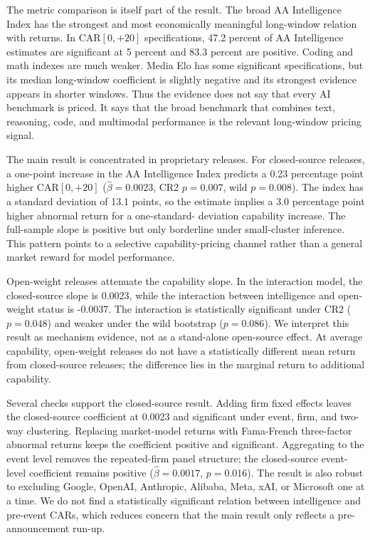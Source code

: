\documentclass[12pt]{article}
\begin{document}
The metric comparison is itself part of the result. The broad AA Intelligence
Index has the strongest and most economically meaningful long-window relation
with returns. In CAR$[0,{+}20]$ specifications, 47.2 percent of AA Intelligence
estimates are significant at 5 percent and 83.3 percent are positive. Coding and
math indexes are much weaker. Media Elo has some significant specifications, but
its median long-window coefficient is slightly negative and its strongest
evidence appears in shorter windows. Thus the evidence does not say that every
AI benchmark is priced. It says that the broad benchmark that combines text,
reasoning, code, and multimodal performance is the relevant long-window pricing
signal.

The main result is concentrated in proprietary releases. For closed-source
releases, a one-point increase in the AA Intelligence Index predicts a 0.23
percentage point higher CAR$[0,{+}20]$ ($\hat{\beta}=0.0023$, CR2 $p=0.007$,
wild $p=0.008$). The index has a standard deviation of 13.1 points, so the
estimate implies a 3.0 percentage point higher abnormal return for a one-standard-
deviation capability increase. The full-sample slope is positive but only
borderline under small-cluster inference. This pattern points to a selective
capability-pricing channel rather than a general market reward for model
performance.

Open-weight releases attenuate the capability slope. In the interaction model,
the closed-source slope is 0.0023, while the interaction between intelligence and
open-weight status is -0.0037. The interaction is statistically significant under
CR2 ($p=0.048$) and weaker under the wild bootstrap ($p=0.086$). We interpret
this result as mechanism evidence, not as a stand-alone open-source effect.
At average capability, open-weight releases do not have a statistically different
mean return from closed-source releases; the difference lies in the marginal
return to additional capability.

Several checks support the closed-source result. Adding firm fixed effects leaves
the closed-source coefficient at 0.0023 and significant under event, firm, and
two-way clustering. Replacing market-model returns with Fama-French three-factor
abnormal returns keeps the coefficient positive and significant. Aggregating to
the event level removes the repeated-firm panel structure; the closed-source
event-level coefficient remains positive ($\hat{\beta}=0.0017$, $p=0.016$).
The result is also robust to excluding Google, OpenAI, Anthropic, Alibaba, Meta,
xAI, or Microsoft one at a time. We do not find a statistically significant
relation between intelligence and pre-event CARs, which reduces concern that the
main result only reflects a pre-announcement run-up.
\end{document}

